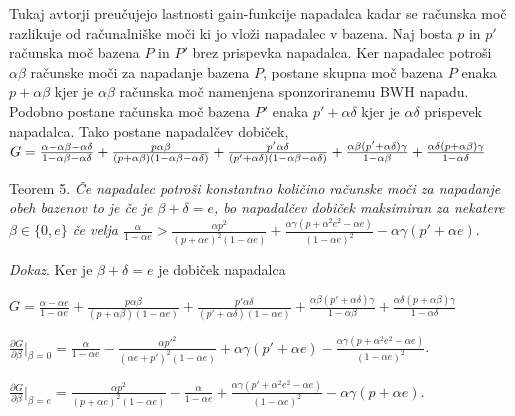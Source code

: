 \documentclass{acm_proc_article-sp}
\begin{document}
Tukaj avtorji preučujejo lastnosti gain-funkcije napadalca kadar se računska moč razlikuje od računalniške moči ki jo vloži napadalec v bazena. Naj bosta \textit{$p$} in \textit{$p'$} računska moč bazena \textit{$P$} in \textit{$P'$} brez prispevka napadalca. Ker napadalec potroši \textit{$\alpha\beta$} računske moči za napadanje bazena \textit{$P$}, postane skupna moč bazena \textit{$P$} enaka \textit{$p + \alpha\beta$} kjer je \textit{$\alpha\beta$} računska moč namenjena sponzoriranemu BWH napadu. Podobno postane računska moč bazena \textit{$P'$} enaka \textit{$p' + \alpha\delta$} kjer je \textit{$\alpha\delta$} prispevek napadalca. Tako postane napadalčev dobiček, \newline
$G = \frac{\alpha - \alpha\beta - \alpha\delta}{1 - \alpha\beta - \alpha\delta} + \frac{p\alpha\beta}{(p+\alpha\beta)(1 - \alpha\beta - \alpha\delta)} + \\ \frac{p'\alpha\delta}{(p' + \alpha\delta)(1 - \alpha\beta - \alpha\delta)} + \frac{\alpha\beta(p' + \alpha\delta)\gamma}{1 - \alpha\beta} + \frac{\alpha\delta(p + \alpha\beta)\gamma}{1 - \alpha\delta}$
\newline

Teorem 5. \textit{Če napadalec potroši konstantno količino računske moči za napadanje obeh bazenov to je če je $\beta + \delta = e$, bo napadalčev dobiček maksimiran za nekatere $\beta \in \{0,e\}$ če velja $\frac{\alpha}{1-\alpha e} > \frac{\alpha p^2}{(p + \alpha e)^2(1 - \alpha e)} + \frac{\alpha\gamma(p+\alpha^2e^2-\alpha e)}{(1-\alpha e)^2} - \alpha\gamma(p' + \alpha e)$}.\newline

\noindent\textit{Dokaz}. Ker je \textit{$\beta + \delta = e$} je dobiček napadalca\newline

\textit{$G = \frac{\alpha - \alpha e}{1 - \alpha e} + \frac{p\alpha\beta}{(p+\alpha\beta)(1-\alpha e)} + \frac{p'\alpha\delta}{(p'+\alpha\delta)(1-\alpha e)} + \frac{\alpha\beta(p' + \alpha\delta)\gamma}{1-\alpha\beta} + \frac{\alpha\delta(p+\alpha\beta)\gamma}{1-\alpha\delta}$}\newline

$\frac{\partial G}{\partial \beta}|_{\beta=0} = \frac{\alpha}{1-\alpha e} -
\frac{\alpha p'^2}{(\alpha e + p')^2(1-\alpha e)} +
\alpha\gamma(p' + \alpha e) - 
\frac{\alpha\gamma(p+\alpha^2 e^2 -\alpha e)}{(1 - \alpha e)^2}$.\newline

$\frac{\partial G}{\partial \beta}|_{\beta=e} = 
\frac{\alpha p^2}{(p+\alpha e)^2(1-\alpha e)} - \frac{\alpha}{1 - \alpha e} +
\frac{\alpha\gamma(p'+\alpha^2 e^2 -\alpha e)}
{(1 - \alpha e)^2} -
\alpha\gamma(p+ \alpha e)$.\newline
\end{document}
